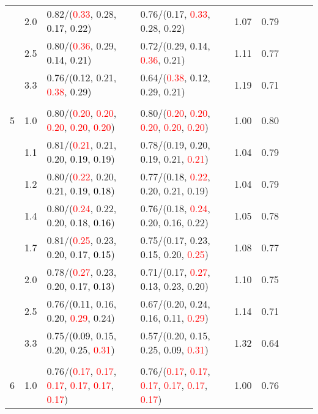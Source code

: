 \documentclass[10pt,a4paper]{report}
\begin{document}
\begin{table}[!htbp]
\begin{center}
{\begin{tabular}{ccllccccc}
			&2.0&0.82/(\textcolor{red}{0.33}, 0.28, \textcolor{black}{0.17}, 0.22)&0.76/(\textcolor{black}{0.17}, \textcolor{red}{0.33}, 0.28, 0.22)&1.07&0.79\\
			&2.5&0.80/(\textcolor{red}{0.36}, 0.29, \textcolor{black}{0.14}, 0.21)&0.72/(0.29, \textcolor{black}{0.14}, \textcolor{red}{0.36}, 0.21)&1.11&0.77\\
			&3.3&0.76/(\textcolor{black}{0.12}, 0.21, \textcolor{red}{0.38}, 0.29)&0.64/(\textcolor{red}{0.38}, \textcolor{black}{0.12}, 0.29, 0.21)&1.19&0.71\\
			&&&&\\
			5			&1.0&0.80/(\textcolor{red}{0.20}, \textcolor{red}{0.20}, \textcolor{red}{0.20}, \textcolor{red}{0.20}, \textcolor{red}{0.20})&0.80/(\textcolor{red}{0.20}, \textcolor{red}{0.20}, \textcolor{red}{0.20}, \textcolor{red}{0.20}, \textcolor{red}{0.20})&1.00&0.80\\
			&1.1&0.81/(\textcolor{red}{0.21}, 0.21, 0.20, \textcolor{black}{0.19}, 0.19)&0.78/(0.19, 0.20, \textcolor{black}{0.19}, 0.21, \textcolor{red}{0.21})&1.04&0.79\\
			&1.2&0.80/(\textcolor{red}{0.22}, 0.20, 0.21, 0.19, \textcolor{black}{0.18})&0.77/(\textcolor{black}{0.18}, \textcolor{red}{0.22}, 0.20, 0.21, 0.19)&1.04&0.79\\
			&1.4&0.80/(\textcolor{red}{0.24}, 0.22, 0.20, 0.18, \textcolor{black}{0.16})&0.76/(0.18, \textcolor{red}{0.24}, 0.20, \textcolor{black}{0.16}, 0.22)&1.05&0.78\\
			&1.7&0.81/(\textcolor{red}{0.25}, 0.23, 0.20, 0.17, \textcolor{black}{0.15})&0.75/(0.17, 0.23, \textcolor{black}{0.15}, 0.20, \textcolor{red}{0.25})&1.08&0.77\\
			&2.0&0.78/(\textcolor{red}{0.27}, 0.23, 0.20, 0.17, \textcolor{black}{0.13})&0.71/(0.17, \textcolor{red}{0.27}, \textcolor{black}{0.13}, 0.23, 0.20)&1.10&0.75\\
			&2.5&0.76/(\textcolor{black}{0.11}, 0.16, 0.20, \textcolor{red}{0.29}, 0.24)&0.67/(0.20, 0.24, 0.16, \textcolor{black}{0.11}, \textcolor{red}{0.29})&1.14&0.71\\
			&3.3&0.75/(\textcolor{black}{0.09}, 0.15, 0.20, 0.25, \textcolor{red}{0.31})&0.57/(0.20, 0.15, 0.25, \textcolor{black}{0.09}, \textcolor{red}{0.31})&1.32&0.64\\
			&&&&\\
			6			&1.0&0.76/(\textcolor{red}{0.17}, \textcolor{red}{0.17}, \textcolor{red}{0.17}, \textcolor{red}{0.17}, \textcolor{red}{0.17}, \textcolor{red}{0.17})&0.76/(\textcolor{red}{0.17}, \textcolor{red}{0.17}, \textcolor{red}{0.17}, \textcolor{red}{0.17}, \textcolor{red}{0.17}, \textcolor{red}{0.17})&1.00&0.76\\

\end{tabular}}
\end{center}
\end{table}
\end{document}
